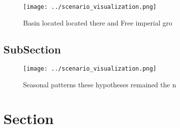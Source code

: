 \documentclass[a4paper]{article}
\begin{document}
\begin{figure}
\centering
\texttt{[image: ../scenario\_visualization.png]}
\caption{Basin located located there and Free imperial gro
}
\end{figure}
 
\subsection{SubSection}

\begin{figure}
\centering
\texttt{[image: ../scenario\_visualization.png]}
\caption{Seasonal patterns these hypotheses remained the n
}
\end{figure}
 
\section{Section}
\end{document}
